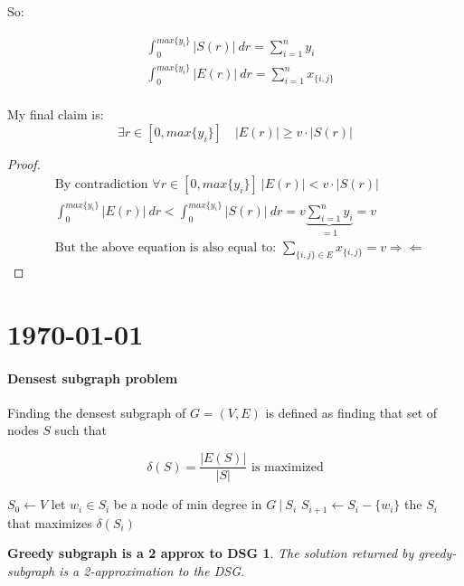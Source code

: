 \documentclass[]{article}
\begin{document}
	So:
	
	\begin{align*}
	&\int_{0}^{max\{y_i\}}|S(r)|\ dr = \sum_{i=1}^{n} y_i\\
	&\int_{0}^{max\{y_i\}} |E(r)|\ dr = \sum_{i=1}^{n} x_{\{i, j\}}\\
	\end{align*}
	
	My final claim is:
	\[
	\exists r \in [0, max\{y_i\}]\quad |E(r)| \geq v\cdot|S(r)|
	\]
	
	\begin{proof}
		

	\begin{align*}
	&\text{By contradiction }\forall r \in [0, max\{y_i\}]\ |E(r)| < v\cdot|S(r)|\\
	&\int_{0}^{max\{y_i\}} |E(r)|\ dr < \int_{0}^{max\{y_i\}}|S(r)|\ dr = v \underbrace{\sum_{i=1}^{n} y_i}_{=1} = v\\
	& \text{But the above equation is also equal to: } \sum_{\{i, j\} \in E} x_{\{i, j\}} = v \Longrightarrow\!\Longleftarrow
	\end{align*}
	\end{proof}

\section{\today}

\paragraph{Densest subgraph problem} Finding the densest subgraph of $G=(V,E)$ is defined as finding that set of nodes $S$ such that 

\[
\delta (S) = \frac{|E(S)|}{|S|} \text{ is maximized}
\]

\begin{algorithm}[H]
	\caption{Greedy-Subgraph( graph: G)}
	\label{alg:sub-greedy}
	\begin{algorithmic}
		\STATE $S_0 \leftarrow V$
		\STATE let $w_i \in S_i$ be a node of min degree in $G\ |\ S_i$
		\STATE $S_{i+1} \leftarrow S_i - \{w_i\}$
		\ENDFOR
		\RETURN the $S_i$ that maximizes $\delta(S_i)$
	\end{algorithmic}
\end{algorithm}

\newtheorem{subgraphbound}{Greedy subgraph is a 2 approx to DSG}

\begin{subgraphbound}
The solution returned by greedy-subgraph is a 2-approximation to the DSG.
\end{subgraphbound}
\end{document}
